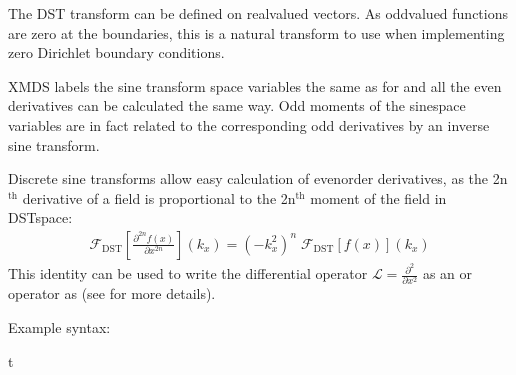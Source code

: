 \documentclass[letterpaper,10pt,english]{sphinxmanual}
\begin{document}
\ignorespaces 
\sphinxAtStartPar
The DST transform can be defined on real\sphinxhyphen{}valued vectors.  As odd\sphinxhyphen{}valued functions are zero at the boundaries, this is a natural transform to use when implementing zero Dirichlet boundary conditions.

\sphinxAtStartPar
XMDS labels the sine transform space variables the same as for {\hyperref[\detokenize{reference_elements:dft-transform}]{}} and all the even derivatives can be calculated the same way.  Odd moments of the sine\sphinxhyphen{}space variables are in fact  related to the corresponding odd derivatives by an inverse sine transform.

\sphinxAtStartPar
Discrete sine transforms allow easy calculation of even\sphinxhyphen{}order derivatives, as the 2n$^{\text{th}}$ derivative of a field is proportional to the 2n$^{\text{th}}$ moment of the field in DST\sphinxhyphen{}space:
\begin{equation*}
\begin{split}\mathcal{F}_\text{DST}\left[\frac{\partial^{2n} f(x)}{\partial x^{2n}}\right](k_x) = (-k_x^2)^{n}\; \mathcal{F}_\text{DST}\left[f(x)\right](k_x)\end{split}
\end{equation*}
\sphinxAtStartPar
This identity can be used to write the differential operator \(\mathcal{L} = \frac{\partial^2}{\partial x^2}\) as an  or  operator as  (see {\hyperref[\detokenize{reference_elements:operatorselement}]{}} for more details).

\sphinxAtStartPar
Example syntax:

\begin{sphinxVerbatim}[commandchars=\\\{\}]
 
         t 
                 
\end{sphinxVerbatim}
\end{document}
